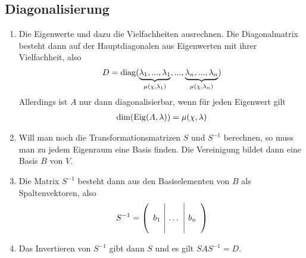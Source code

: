 \documentclass[ngerman,a4paper]{article}
\DeclareMathOperator{\Eig}{Eig}
\DeclareMathOperator{\diag}{diag}
\begin{document}
\subsection{Diagonalisierung}
\begin{enumerate}[label=\textbf{\arabic*.}]
	\item Die Eigenwerte und dazu die Vielfachheiten ausrechnen. Die Diagonalmatrix besteht dann auf der Hauptdiagonalen aus Eigenwerten mit ihrer Vielfachheit, also
	\begin{align}
		D = \diag(\underbrace{\lambda_1, ..., \lambda_1}_{\mu(\chi,\lambda_1)}, ..., \underbrace{\lambda_n, ..., \lambda_n}_{\mu(\chi,\lambda_n)})\notag
	\end{align}
	Allerdings ist $A$ nur dann diagonalisierbar, wenn f\"ur jeden Eigenwert gilt
	\begin{align}
		\dim(\Eig(A,\lambda)) = \mu(\chi,\lambda)\notag
	\end{align}
	\item Will man noch die Transformationsmatrizen $S$ und $S^{-1}$ berechnen, so muss man zu jedem Eigenraum eine Basis finden. Die Vereinigung bildet dann eine Basis $B$ von $V$.
	\item Die Matrix $S^{-1}$ besteht dann aus den Basiselementen von $B$ als Spaltenvektoren, also
	\begin{align}
		S^{-1} = \left(\begin{array}{c|c|c}
		&& \\
		b_1 & \dots & b_n \\
		&&
		\end{array}\right)\notag
	\end{align}
	\item Das Invertieren von $S^{-1}$ gibt dann $S$ und es gilt $SAS^{-1}=D$.
\end{enumerate}
\end{document}
